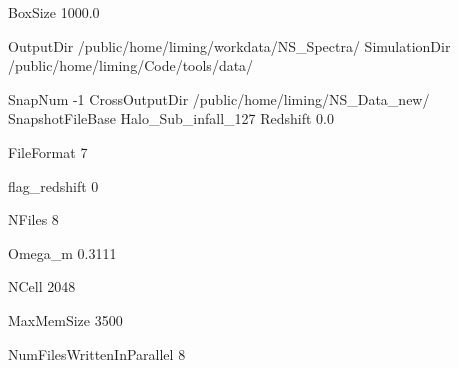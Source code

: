 BoxSize 1000.0

OutputDir     /public/home/liming/workdata/NS_Spectra/
SimulationDir /public/home/liming/Code/tools/data/

SnapNum -1
CrossOutputDir /public/home/liming/NS_Data_new/
SnapshotFileBase Halo_Sub_infall_127
Redshift 0.0

FileFormat 7

flag_redshift 0 

NFiles  8 %

Omega_m 0.3111

NCell   2048 

MaxMemSize  3500 

NumFilesWrittenInParallel 8

